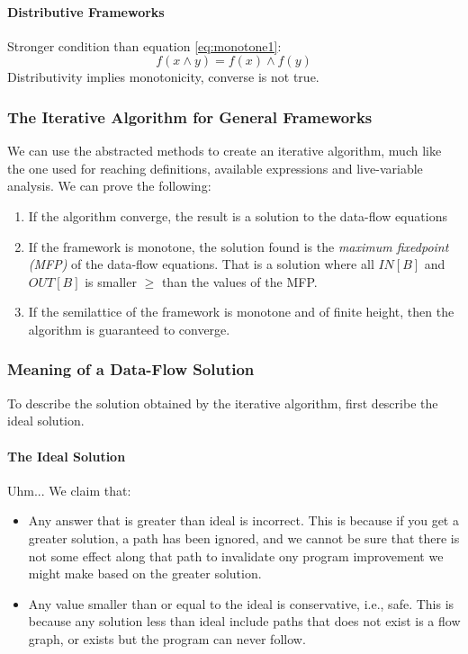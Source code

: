\documentclass{article}
\begin{document}
\paragraph{Distributive Frameworks} %
\label{par:Distributive Frameworks}
Stronger condition than equation \ref{eq:monotone1}:
\begin{equation}
	f(x \wedge y) = f(x) \wedge f(y)
\end{equation}
Distributivity implies monotonicity, converse is not true.


\subsubsection{The Iterative Algorithm for General Frameworks} %
\label{ssub:The Iterative Algorithm for General Frameworks}
We can use the abstracted methods to create an iterative algorithm, much like the one used for reaching definitions, available expressions and live-variable analysis. We can prove the following:
\begin{enumerate}
	\item If the algorithm converge, the result is a solution to the data-flow equations
	\item If the framework is monotone, the solution found is the \emph{maximum fixedpoint (MFP)} of the data-flow equations. That is a solution where all $IN[B]$ and $OUT[B]$ is smaller $\ge$ than the values of the MFP.
	\item If the semilattice of the framework is monotone and of finite height, then the algorithm is guaranteed to converge.
\end{enumerate}

\subsubsection{Meaning of a Data-Flow Solution} %
\label{ssub:Meaning of a Data-Flow Solution}
To describe the solution obtained by the iterative algorithm, first describe the ideal solution.

\paragraph{The Ideal Solution} %
\label{par:The Ideal Solution}
Uhm... We claim that:
\begin{itemize}
	\item Any answer that is greater than ideal is incorrect. This is because if you get a greater solution, a path has been ignored, and we cannot be sure that there is not some effect along that path to invalidate ony program improvement we might make based on the greater solution.
	\item Any value smaller than or equal to the ideal is conservative, i.e., safe. This is because any solution less than ideal include paths that does not exist is a flow graph, or exists but the program can never follow.
\end{itemize}
\end{document}
